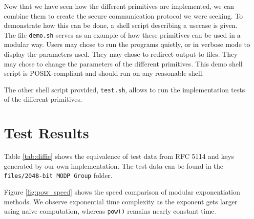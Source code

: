 \documentclass{article}
\begin{document}
Now that we have seen how the different primitives are implemented, we can combine them to create the secure communication protocol we were seeking. To demonstrate how this can be done, a shell script describing a usecase is given. The file \verb+demo.sh+ serves as an example of how these primitives can be used in a modular way. Users may chose to run the programs quietly, or in verbose mode to display the parameters used. They may chose to redirect output to files. They may chose to change the parameters of the different primitives. This demo shell script is POSIX-compliant and should run on any reasonable shell. 
  
The other shell script provided, \verb+test.sh+, allows to run the implementation tests of the different primitives. 

\section{Test Results}

Table \ref{tab:diffie} shows the equivalence of test data from RFC 5114 \cite{rfc5114} and keys generated by our own implementation. The test data can be found in the \verb+files/2048-bit MODP Group+ folder.


Figure \ref{fig:pow_speed} shows the speed comparison of modular exponentiation methods. We observe exponential time complexity as the exponent gets larger using naive computation, whereas \verb+pow()+ remains nearly constant time.
\end{document}
